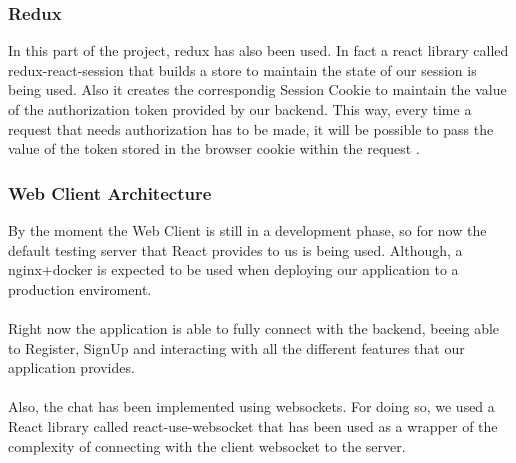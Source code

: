 \documentclass[./main.tex]{subfiles}
\begin{document}
\subsubsection{Redux}
In this part of the project, redux has also been used. In fact a react library
called redux-react-session that builds a store to maintain the state of our session is being used.
Also it creates the correspondig Session Cookie to maintain the value of the authorization token
provided by our backend. This way, every time a request that needs authorization has to be made,
it will be possible to pass the value of the token stored in the browser cookie within the request .
\subsubsection{Web Client Architecture}
By the moment the Web Client is still in a development phase, so for 
now the default testing server that React provides to us is being used.
Although, a nginx+docker is expected to be used when deploying our application
to a production enviroment.
\\\\
Right now the application is able to fully connect with the backend,
beeing able to Register, SignUp and interacting with all the different 
features that our application provides.
\\\\
Also, the chat has been implemented using websockets. For doing so, we used a React library called 
react-use-websocket that has been used as a wrapper of the complexity of connecting with the client websocket to the server.
\end{document}
